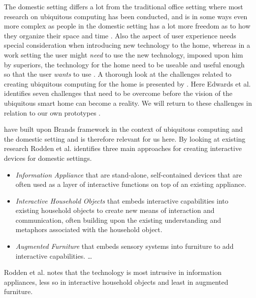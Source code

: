The domestic setting differs a lot from the traditional office setting where most research on ubiquitous computing has been conducted, and is in some ways even more complex as people in the domestic setting has a lot more freedom as to how they organize their space and time \cite{meyer2003survey}.
Also the aspect of user experience needs special consideration when introducing new technology to the home, whereas in a work setting the user might \emph{need} to use the new technology, imposed upon him by superiors, the technology for the home need to be useable and useful enough so that the user \emph{wants} to use \citep{meyer2003survey}.
A thorough look at the challenges related to creating ubiquitous computing for the home is presented by \citet{edwards2001home}.
Here Edwards et al. identifies seven challenges that need to be overcome before the vision of the ubiquitous smart home can become a reality. We will return to these challenges in relation to our own prototypes .

\citet{rodden2003evolution} have built upon Brands framework in the context of ubiquitous computing and the domestic setting and is therefore relevant for us here.
By looking at existing research Rodden et al. identifies three main approaches for creating interactive devices for domestic settings.

\begin{itemize}
  \item \emph{Information Appliance} that are stand-alone, self-contained devices that are often used as a layer of interactive functions on top of an existing appliance.
  \item \emph{Interactive Household Objects} that embeds interactive capabilities into existing household objects to create new means of interaction and communication, often building upon the existing understanding and metaphors associated with the household object.
  \item \emph{Augmented Furniture} that embeds sensory systems into furniture to add interactive capabilities. \ldots
\end{itemize}

Rodden et al. notes that the technology is most intrusive in information appliances, less so in interactive household objects and least in augmented furniture.

